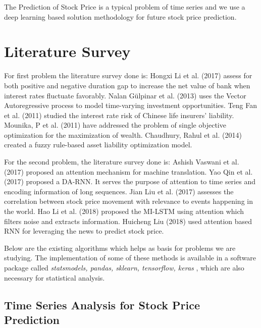 		The Prediction of Stock Price is a typical problem of time series and we use a deep learning based solution methodology for future stock price prediction.

\section{Literature Survey}

	For first problem the literature survey done is: Hongxi Li et al. (2017) assess for both positive and negative duration gap to increase the net value of bank when interest rates fluctuate favorably\cite{4}. Nalan Gülpinar et al. (2013) uses the Vector Autoregressive process to model time-varying investment opportunities\cite{3}. Teng Fan et al. (2011) studied the interest rate risk of Chinese life insurers’ liability\cite{1}. Mounika, P et al. (2011) have addressed the problem of single objective optimization for the maximization of wealth\cite{16}. Chaudhury, Rahul et al. (2014) created a fuzzy rule-based asset liability optimization model\cite{17}.

	For the second problem, the literature survey done is: Ashish Vaswani et al. (2017) proposed an attention mechanism for machine translation\cite{2}. Yao Qin et al. (2017) proposed a DA-RNN. It serves the purpose of attention to time series and encoding information of long sequences\cite{6}. Jian Liu et al. (2017) assesses the correlation between stock price movement with relevance to events happening in the world\cite{7}. Hao Li et al. (2018) proposed the MI-LSTM using attention which filters noise and extracts information\cite{8}. Huicheng Liu (2018) used attention based RNN for leveraging the news to predict stock price\cite{9}.

Below are the existing algorithms which helps as basis for problems we are studying. The implementation of some of these methods is available in a software package called \emph{statsmodels, pandas, sklearn, tensorflow, keras} \cite{5} \cite{12} \cite{14} \cite{15}, which are also necessary for statistical analysis.



\subsection{Time Series Analysis for Stock Price Prediction}

